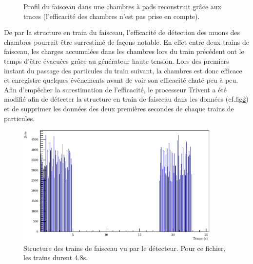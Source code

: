 \begin{figure}[ht!]
	\centering
	\hfill
	\caption{Profil du faisceau dans une chambres à pads reconstruit grâce aux traces (l’efficacité des chambres n’est pas prise en compte).}
	\label{ProfilFaisceauSPS}
\end{figure}

De par la structure en train du faisceau, l'efficacité de détection des muons des chambres pourrait être surrestimé de façons notable. En effet entre deux trains de faisceau, les charges accumulées dans les chambres lors du train précédent ont le temps d'être évacuées grâce au générateur haute tension. Lors des premiers instant du passage des particules du train suivant, la chambres est donc efficace et enregistre quelques événements avant de voir son efficacité chuté peu à peu. Afin d'empêcher la surestimation de l'efficacité, le processeur Trivent a été modifié afin de détecter la structure en train de faisceau dans les données (cf.fig\ref{StructureSpill}) et de supprimer les données des deux premières secondes de chaque trains de particules.

\begin{figure}[!ht]
	\centering
	\includegraphics[width=0.9\textwidth]{GLA/SpillStructure.pdf}
	\caption{Structure des trains de faisceau vu par le détecteur. Pour ce fichier, les trains durent 4.8s.}
	\label{StructureSpill}
\end{figure}

